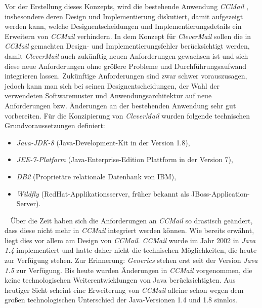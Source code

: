 \newline
\newline
Vor der Erstellung dieses Konzepts, wird die bestehende Anwendung \emph{CCMail} , insbesondere deren Design und Implementierung diskutiert, damit aufgezeigt werden kann, welche Designentscheidungen und Implementierungsdetails ein Erweitern von \emph{CCMail} verhindern. In dem Konzept für \emph{CleverMail} sollen die in \emph{CCMail} gemachten Design- und Implementierungsfehler berücksichtigt werden, damit \emph{CleverMail} auch zukünftig neuen Anforderungen gewachsen ist und sich diese neue Anforderungen ohne größere Probleme und Durchführungsaufwand integrieren lassen. Zukünftige Anforderungen sind zwar schwer vorauszusagen, jedoch kann man sich bei seinen Designentscheidungen, der Wahl der verwendeten Softwaremuster und Anwendungsarchitektur auf neue Anforderungen bzw. Änderungen an der bestehenden Anwendung sehr gut vorbereiten.
\newline
\newline
Für die Konzipierung von \emph{CleverMail} wurden folgende technischen Grundvoraussetzungen definiert:
\begin{itemize}
	\item \emph{Java-JDK-8} (Java-Development-Kit in der Version 1.8),
	\item \emph{JEE-7-Platform} (Java-Enterprise-Edition Plattform in der Version 7),
	\item \emph{DB2} (Proprietäre relationale Datenbank von IBM),
	\item \emph{Wildfly} (RedHat-Applikationsserver, früher bekannt als JBoss-Application-Server).
\end{itemize} 
\ \newline
Über die Zeit haben sich die Anforderungen an \emph{CCMail} so drastisch geändert, dass diese nicht mehr in \emph{CCMail} integriert werden können. Wie bereits erwähnt, liegt dies vor allem am Design von \emph{CCMail}. \emph{CCMail} wurde im Jahr 2002 in \emph{Java 1.4} implementiert und hatte daher nicht die technischen Möglichkeiten, die heute zur Verfügung stehen. Zur Erinnerung: \emph{Generics} stehen erst seit der Version \emph{Java 1.5} zur Verfügung. Bis heute wurden Änderungen in \emph{CCMail} vorgenommen, die keine technologischen Weiterentwicklungen von Java berücksichtigten. Aus heutiger Sicht scheint eine Erweiterung von \emph{CCMail} alleine schon wegen dem großen technologischen Unterschied der Java-Versionen 1.4 und 1.8 sinnlos.
\newline
\newline
